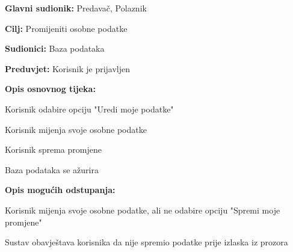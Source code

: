 			\noindent {}
			\begin{packed_item}
				
				\item \textbf{Glavni sudionik:} Predavač, Polaznik
				\item  \textbf{Cilj:} Promijeniti osobne podatke
				\item  \textbf{Sudionici:} Baza podataka
				\item  \textbf{Preduvjet:} Korisnik je prijavljen
				\item  \textbf{Opis osnovnog tijeka:}
				
				\item[] \begin{packed_enum}
					
					\item Korisnik odabire opciju "Uredi moje podatke"
					\item Korisnik mijenja svoje osobne podatke
					\item Korisnik sprema promjene
					\item Baza podataka se ažurira
					
				\end{packed_enum}
				\item  \textbf{Opis mogućih odstupanja:}
				
				\item[] \begin{packed_item}
					
					\item[2.a] Korisnik mijenja svoje osobne podatke, ali ne odabire opciju "Spremi moje promjene"
					\item[] \begin{packed_enum}
						
						\item Sustav obavještava korisnika da nije spremio podatke prije izlaska iz prozora
						
					\end{packed_enum}
					
				\end{packed_item}
				
			\end{packed_item}
			
